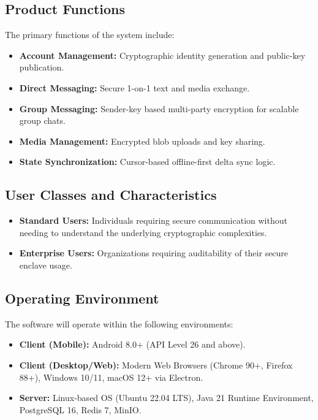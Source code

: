 \documentclass[12pt, a4paper]{article}
\begin{document}
\subsection{Product Functions}
The primary functions of the system include:
\begin{itemize}
    \item \textbf{Account Management:} Cryptographic identity generation and public-key publication.
    \item \textbf{Direct Messaging:} Secure 1-on-1 text and media exchange.
    \item \textbf{Group Messaging:} Sender-key based multi-party encryption for scalable group chats.
    \item \textbf{Media Management:} Encrypted blob uploads and key sharing.
    \item \textbf{State Synchronization:} Cursor-based offline-first delta sync logic.
\end{itemize}

\subsection{User Classes and Characteristics}
\begin{itemize}
    \item \textbf{Standard Users:} Individuals requiring secure communication without needing to understand the underlying cryptographic complexities.
    \item \textbf{Enterprise Users:} Organizations requiring auditability of their secure enclave usage.
\end{itemize}

\subsection{Operating Environment}
The software will operate within the following environments:
\begin{itemize}
    \item \textbf{Client (Mobile):} Android 8.0+ (API Level 26 and above).
    \item \textbf{Client (Desktop/Web):} Modern Web Browsers (Chrome 90+, Firefox 88+), Windows 10/11, macOS 12+ via Electron.
    \item \textbf{Server:} Linux-based OS (Ubuntu 22.04 LTS), Java 21 Runtime Environment, PostgreSQL 16, Redis 7, MinIO.
\end{itemize}
\end{document}
